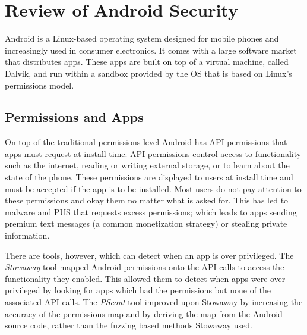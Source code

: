 \documentclass[report.tex]{subfiles}
\begin{document}
\section{Review of Android Security}

Android is a Linux-based operating system designed for mobile phones and
increasingly used in consumer electronics.  It comes with a large software
market that distributes apps.  These apps are built on top of a virtual machine,
called Dalvik, and run within a sandbox provided by the OS that is based on
Linux's permissions model\cite{Drake:2014uq}.

\subsection{Permissions and Apps}

On top of the traditional permissions level Android has API permissions that
apps must request at install time.  API permissions control access to
functionality such as the internet, reading or writing external storage, or to
learn about the state of the phone.  These permissions are displayed to users at
install time and must be accepted if the app is to be installed.  Most users do
not pay attention to these permissions and okay them no matter what is asked
for\cite{Felt:2012hm}.  This has led to malware and \ac{PUS} that requests
excess permissions; which leads to apps sending premium text messages (a common
monetization strategy\cite{Chien:2011vw}) or stealing private information.

There are tools, however, which can detect when an app is over privileged.  The
\emph{Stowaway} tool\cite{Felt:2011kj} mapped Android permissions onto the API
calls to access the functionality they enabled.  This allowed them to detect
when apps were over privileged by looking for apps which had the permissions but
none of the associated API calls.  The \emph{PScout} tool\cite{Au:2012ju}
improved upon Stowaway by increasing the accuracy of the permissions map and by
deriving the map from the Android source code, rather than the fuzzing based
methods Stowaway used.
\end{document}
